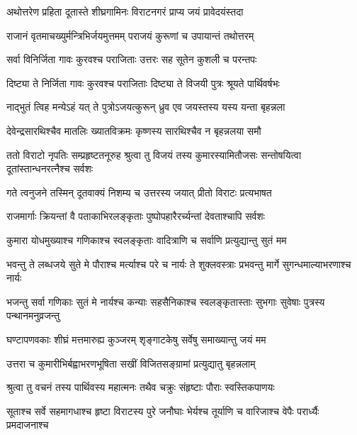 
\twolineshloka
{अथोत्तरेण प्रहिता दूतास्ते शीघ्रगामिनः}
{विराटनगरं प्राप्य जयं प्रावेदयंस्तदा}


\twolineshloka
{राजानं वृतमाचख्युर्मन्त्रिभिर्जयमुत्तमम्}
{पराजयं कुरूणां च उपायान्तं तथोत्तरम्}


\twolineshloka
{सर्वा विनिर्जिता गावः कुरवश्च पराजिताः}
{उत्तरः सह सूतेन कुशली च परन्तपः}




\twolineshloka
{दिष्ट्या ते निर्जिता गावः कुरवश्च पराजिताः}
{दिष्ट्या ते विजयी पुत्रः श्रूयते पार्थिवर्षभः}


\twolineshloka
{नाद्भुतं त्विह मन्येऽहं यत् ते पुत्रोऽजयत्कुरून्}
{ध्रुव एव जयस्तस्य यस्य यन्ता बृहन्नला}


\twolineshloka
{देवेन्द्रसारथिश्चैव मातलिः ख्यातविक्रमः}
{कृष्णस्य सारथिश्चैव न बृहन्नलया समौ}



\threelineshloka
{ततो विराटो नृपतिः सम्प्रहृष्टतनूरुह}
{श्रुत्वा तु विजयं तस्य कुमारस्यामितौजसः}
{सन्तोषयित्वा दूतांस्तान्धनरत्नैश्च सर्वशः}


\twolineshloka
{गते त्वनुजने तस्मिन् दूतवाक्यं निशम्य च}
{उत्तरस्य जयात् प्रीतो विराटः प्रत्यभाषत}


\twolineshloka
{राजमार्गाः क्रियन्तां वै पताकाभिरलङ्कृताः}
{पुष्पोपहारैरर्च्यन्तां देवताश्चापि सर्वशः}


\twolineshloka
{कुमारा योधमुख्याश्च गणिकाश्च स्वलङ्कृताः}
{वादित्राणि च सर्वाणि प्रत्युद्यान्तु सुतं मम}


\fourlineindentedshloka
{भवन्तु ते लब्धजये सुते मे}
{पौराश्च मर्त्याश्च परे च नार्यः}
{ते शुक्लवस्त्राः प्रभवन्तु मार्गे}
{सुगन्धमाल्याभरणाश्च नार्यः}


\fourlineindentedshloka
{भजन्तु सर्वा गणिकाः सुतं मे}
{नार्यश्च कन्याः सहसैनिकाश्च}
{स्वलङ्कृतास्ताः सुभगाः सुवेषाः}
{पुत्रस्य पन्थानमनुव्रजन्तु}


\twolineshloka
{घण्टापणवकाः शीघ्रं मत्तमारुह्य कुञ्जरम्}
{शृङ्गाटकेषु सर्वेषु समाख्यान्तु जयं मम}


\twolineshloka
{उत्तरा च कुमारीभिर्बह्वाभरणभूषिता}
{सखीं विजितसङ्ग्रामां प्रत्युद्यातु बृहन्नलाम्}


\twolineshloka
{श्रुत्वा तु वचनं तस्य पार्थिवस्य महात्मनः}
{तथैव चक्रुः संहृष्टाः पौराः स्वस्तिकपाणयः}


\fourlineindentedshloka
{सूताश्च सर्वे सहमागधाश्च}
{हृष्टा विराटस्य पुरे जनौघाः}
{भेर्यश्च तूर्याणि च वारिजाश्च}
{वेपैः परार्ध्यैः प्रमदाजनाश्च}


